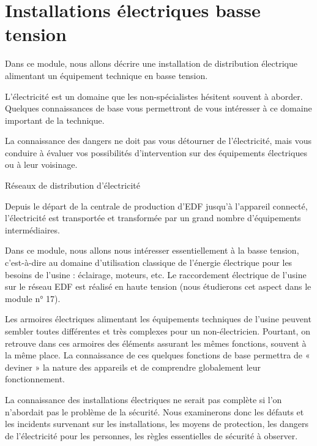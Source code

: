 \chapter{Installations électriques basse tension}


Dans ce module, nous allons décrire une installation de distribution électrique alimentant un équipement technique en basse tension.
\vspace{0.3cm}

L’électricité est un domaine que les non-spécialistes hésitent souvent à aborder. Quelques connaissances de base vous permettront de vous intéresser à ce domaine important de la technique.
\vspace{0.3cm}

La connaissance des dangers ne doit pas vous détourner de l’électricité, mais vous conduire à évaluer vos possibilités d’intervention sur des équipements électriques ou à leur voisinage.


\vspace{0.3cm}
Réseaux de distribution d'électricité
\vspace{0.3cm}

Depuis le départ de la centrale de production d’EDF jusqu’à l’appareil connecté, l’électricité est transportée et transformée par un grand nombre d’équipements intermédiaires.
\vspace{0.3cm}

Dans ce module, nous allons nous intéresser essentiellement à la basse tension, c’est-à-dire au domaine d’utilisation classique de l’énergie électrique pour les besoins de l’usine : éclairage, moteurs, etc. Le raccordement électrique de l’usine sur le réseau EDF est réalisé en haute tension (nous étudierons cet aspect dans le module n° 17).
\vspace{0.3cm}

Les armoires électriques alimentant les équipements techniques de l’usine peuvent sembler toutes différentes et très complexes pour un non-électricien. Pourtant, on retrouve dans ces armoires des éléments assurant les mêmes fonctions, souvent à la même place. La connaissance de ces quelques fonctions de base permettra de « deviner » la nature des appareils et de comprendre globalement leur fonctionnement.
\vspace{0.3cm}

La connaissance des installations électriques ne serait pas complète si l’on n’abordait pas le problème de la sécurité. Nous examinerons donc les défauts et les incidents survenant sur les installations, les moyens de protection, les dangers de l’électricité pour les personnes, les règles essentielles de sécurité à observer.


